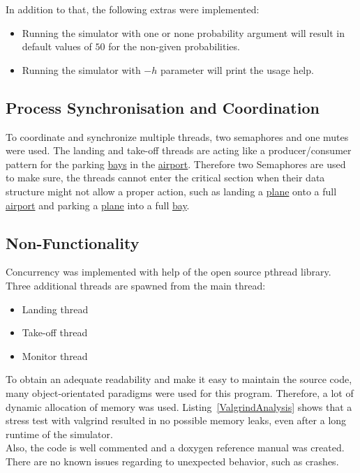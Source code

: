 \documentclass[a4paper, 12pt]{scrartcl} %
\begin{document}
In addition to that, the following extras were implemented:
\begin{itemize}
  \item Running the simulator with one or none probability argument will result
    in default values of $50$ for the non-given probabilities.
  \item Running the simulator with $-h$ parameter will print the usage help.
\end{itemize}

\subsection{Process Synchronisation and Coordination}

To coordinate and synchronize multiple threads, two semaphores and one mutes
were used. The landing and take-off threads are acting like a producer/consumer
pattern for the parking \hyperref[sec:bay]{bays} in the
\hyperref[sec:airport]{airport}. Therefore two Semaphores are used to make
sure, the threads cannot enter the critical section when their data structure
might not allow a proper action, such as landing a \hyperref[sec:plane]{plane}
onto a full \hyperref[sec:airport]{airport} and parking a
\hyperref[sec:plane]{plane} into a full \hyperref[sec:bay]{bay}.

\subsection{Non-Functionality}

Concurrency was implemented with help of the open source pthread library.
Three additional threads are spawned from the main thread:
\begin{itemize}
  \item Landing thread
  \item Take-off thread
  \item Monitor thread
\end{itemize}

To obtain an adequate readability and make it easy to maintain the source code,
many object-orientated paradigms were used for this program. Therefore, a lot
of dynamic allocation of memory was used. Listing~\ref{ValgrindAnalysis} shows
that a stress test with valgrind resulted in no possible memory leaks, even
after a long runtime of the simulator.\\
Also, the code is well commented and a doxygen reference manual was created. \\
There are no known issues regarding to unexpected behavior, such as crashes.
\end{document}
